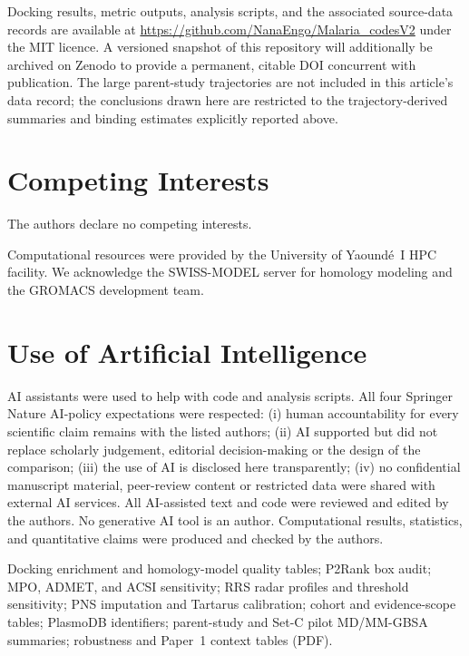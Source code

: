 \documentclass[journal=jcisd8,manuscript=article,layout=traditional]{achemso}
\begin{document}
Docking results, metric outputs, analysis scripts, and the associated source-data records are available at \url{https://github.com/NanaEngo/Malaria_codesV2} under the MIT licence. A versioned snapshot of this repository will additionally be archived on Zenodo to provide a permanent, citable DOI concurrent with publication. The large parent-study trajectories are not included in this article's data record; the conclusions drawn here are restricted to the trajectory-derived summaries and binding estimates explicitly reported above.

\section*{Competing Interests}

The authors declare no competing interests.

\begin{acknowledgement}
Computational resources were provided by the University of Yaound\'{e}~I HPC facility. We acknowledge the SWISS-MODEL server for homology modeling and the GROMACS development team.
\end{acknowledgement}

\section*{Use of Artificial Intelligence}

AI assistants were used to help with code and analysis scripts. All four Springer Nature AI-policy expectations were respected: (i) human accountability for every scientific claim remains with the listed authors; (ii) AI supported but did not replace scholarly judgement, editorial decision-making or the design of the comparison; (iii) the use of AI is disclosed here transparently; (iv) no confidential manuscript material, peer-review content or restricted data were shared with external AI services. All AI-assisted text and code were reviewed and edited by the authors. No generative AI tool is an author. Computational results, statistics, and quantitative claims were produced and checked by the authors.

\begin{suppinfo}
Docking enrichment and homology-model quality tables; P2Rank box audit; MPO, ADMET, and ACSI sensitivity; RRS radar profiles and threshold sensitivity; PNS imputation and Tartarus calibration; cohort and evidence-scope tables; PlasmoDB identifiers; parent-study and Set-C pilot MD/MM-GBSA summaries; robustness and Paper~1 context tables (PDF).
\end{suppinfo}



\end{document}
